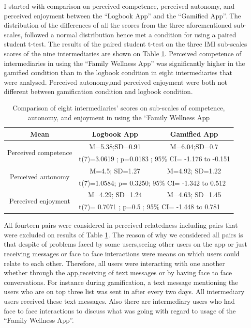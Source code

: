 I started with comparison on perceived competence, perceived autonomy, and perceived enjoyment between the ``Logbook App''  and the ``Gamified App''. The distribution of the differences of all the scores from the three aforementioned sub-scales, followed a normal distribution hence met a condition for using a paired student t-test. The results of the paired student t-test on the three IMI sub-scales scores of the nine intermediaries are shown on Table \ref{table:imiwellnessinterm}. Perceived competence of intermediaries in using the ``Family Wellness App'' was significantly higher in the gamified condition than in the logbook condition in eight intermediaries that were analysed. Perceived autonomy,and perceived enjoyment were both not different between gamification condition and logbook condition. \newline
\begin{table}[h!]
  \begin{center}
    \caption{Comparison of eight intermediaries' scores on sub-scales of competence, autonomy, and enjoyment in using the ``Family Wellness App}
    \label{table:imiwellnessinterm}
	\begin{tabular}{|c|c|c|}
		\hline
		Mean &Logbook App&Gamified App\\
		\hline
		 \multirow{2}{*}{Perceived competence}&M=5.38;SD=0.91&M=6.04;SD=0.7\\\cline{2-3} 

		 &\multicolumn{2}{|l|}{t(7)=3.0619 ; p=0.0183 ; 95\% CI= -1.176 to -0.151   } \\
\hline
		 \multirow{2}{*}{Perceived autonomy}&M=4.5; SD=1.27&M=4.92; SD=1.22\\\cline{2-3} 

		 &\multicolumn{2}{|l|}{t(7)=1.0584; p= 0.3250; 95\% CI= -1.342 to 0.512  } \\
\hline
		 \multirow{2}{*}{Perceived enjoyment}&M=4.29; SD=1.24&M=4.63; SD=1.45\\\cline{2-3} 

		 &\multicolumn{2}{|l|}{t(7)= 0.7071 ; p=0.5 ; 95\% CI=  -1.448 to 0.781 } \\
\hline
	\end{tabular}
  \end{center}
\end{table}
\newline  
All fourteen pairs were considered in perceived relatedness including pairs that were excluded on results of Table \ref{table:imiwellnessinterm}. The reason of why we considered all pairs is that despite of problems faced by some users,seeing other users on the app or just receiving messages  or face to face interactions were means on which users could relate to each other.  Therefore, all users were interacting with one another whether through the app,receiving of text messages or by having face to face conversations. For instance during gamification, a text message mentioning the users who are on top three list was sent in after every two days. All intermediary users received these text messages. Also there are intermediary users who had face to face interactions to discuss what was going with regard to usage of the ``Family Wellness App''.\newline
